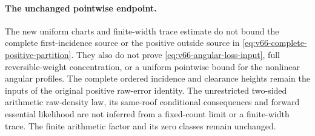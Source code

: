 \paragraph{The unchanged pointwise endpoint.}
The new uniform charts and finite-width trace estimate do not bound
the complete first-incidence source or the positive outside source in
\eqref{eq:v66-complete-positive-partition}. They also do not prove
\eqref{eq:v66-angular-loss-input}, full reversible-weight concentration,
or a uniform pointwise bound for the nonlinear angular profiles.
The complete ordered incidence and clearance heights remain the inputs
of the original positive raw-error identity. The unrestricted two-sided
arithmetic raw-density law, its same-roof conditional consequences and
forward essential likelihood are not inferred from a fixed-count limit
or a finite-width trace. The finite arithmetic factor and its zero
classes remain unchanged.
